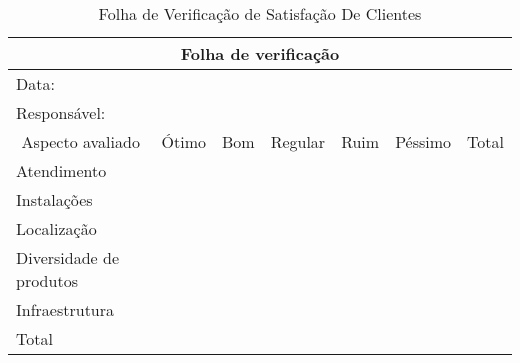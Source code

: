 \documentclass{article}
\begin{document}
\begin{table}[h!]
\centering
\caption{Folha de Verificação de Satisfação De Clientes}
\begin{tabular}{|lllllll|}
\hline
\multicolumn{7}{|c|}{Folha de verificação}                                                                                                                                                              \\ \hline
\multicolumn{7}{|l|}{Data:}                                                                                                                                                                             \\ \hline
\multicolumn{7}{|l|}{Responsável:}                                                                                                                                                                      \\ \hline
\multicolumn{1}{|c|}{Aspecto avaliado}        & \multicolumn{1}{c|}{Ótimo} & \multicolumn{1}{c|}{Bom} & \multicolumn{1}{c|}{Regular} & \multicolumn{1}{l|}{Ruim} & \multicolumn{1}{c|}{Péssimo} & Total \\ \hline
\multicolumn{1}{|l|}{Atendimento}             & \multicolumn{1}{l|}{}      & \multicolumn{1}{l|}{}    & \multicolumn{1}{l|}{}        & \multicolumn{1}{l|}{}     & \multicolumn{1}{l|}{}        &       \\ \hline
\multicolumn{1}{|l|}{Instalações}             & \multicolumn{1}{l|}{}      & \multicolumn{1}{l|}{}    & \multicolumn{1}{l|}{}        & \multicolumn{1}{l|}{}     & \multicolumn{1}{l|}{}        &       \\ \hline
\multicolumn{1}{|l|}{Localização}             & \multicolumn{1}{l|}{}      & \multicolumn{1}{l|}{}    & \multicolumn{1}{l|}{}        & \multicolumn{1}{l|}{}     & \multicolumn{1}{l|}{}        &       \\ \hline
\multicolumn{1}{|l|}{Diversidade de produtos} & \multicolumn{1}{l|}{}      & \multicolumn{1}{l|}{}    & \multicolumn{1}{l|}{}        & \multicolumn{1}{l|}{}     & \multicolumn{1}{l|}{}        &       \\ \hline
\multicolumn{1}{|l|}{Infraestrutura}          & \multicolumn{1}{l|}{}      & \multicolumn{1}{l|}{}    & \multicolumn{1}{l|}{}        & \multicolumn{1}{l|}{}     & \multicolumn{1}{l|}{}        &       \\ \hline
\multicolumn{1}{|l|}{Total}                   & \multicolumn{1}{l|}{}      & \multicolumn{1}{l|}{}    & \multicolumn{1}{l|}{}        & \multicolumn{1}{l|}{}     & \multicolumn{1}{l|}{}        &       \\ \hline
\end{tabular}
\end{table}
\end{document}
